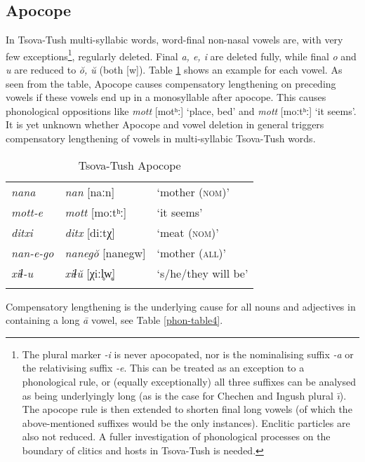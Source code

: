 \subsection{Apocope}

In Tsova-Tush multi-syllabic words, word-final non-nasal vowels are, with very few exceptions\footnote{The plural marker \textit{-i} is never apocopated, nor is the nominalising suffix \textit{-a} or the relativising suffix \textit{-e}. This can be treated as an exception to a phonological rule, or (equally exceptionally) all three suffixes can be analysed as being underlyingly long (as is the case for Chechen and Ingush plural \textit{\={\i}}). The apocope rule is then extended to shorten final long vowels (of which the above-mentioned suffixes would be the only instances). Enclitic particles are also not reduced. A fuller investigation of phonological processes on the boundary of clitics and hosts in Tsova-Tush is needed.}, regularly deleted. Final \textit{a, e, i} are deleted fully, while final \textit{o} and \textit{u} are reduced to \textit{\u{o}, \u{u}} (both [w]). Table \ref{phon-table3} shows an example for each vowel. As seen from the table, Apocope causes compensatory lengthening on preceding vowels if these vowels end up in a monosyllable after apocope. This causes phonological oppositions like \textit{mott} [motʰː] `place, bed' and \textit{mott} [moːtʰː] `it seems'. It is yet unknown whether Apocope and vowel deletion in general triggers compensatory lengthening of vowels in multi\hyp syllabic Tsova-Tush words.

\begin{table}
	\begin{tabular}{lll}
		\lsptoprule
		\textit{nana} & \textit{nan} [naːn]& `mother (\textsc{nom})' \\
		\textit{mott-e} & \textit{mott} [moːtʰː] & `it seems' \\
		\textit{ditxi} & \textit{ditx} [diːtχ] & `meat (\textsc{nom})' \\
		\textit{nan-e-go} & \textit{naneg\u{o}} [nanegw] & `mother (\textsc{all})' \\
		\textit{xiɬ-u} & \textit{xiɬ\u{u}} [χiːl̥w̥] & `s/he/they will be' \\
		\lspbottomrule
	\end{tabular}
	\caption{Tsova-Tush Apocope}
	\label{phon-table3}
\end{table}

Compensatory lengthening is the underlying cause for all nouns and adjectives in \textcite{kadkad84} containing a long \textit{\={a}} vowel, see Table \ref{phon-table4}.

